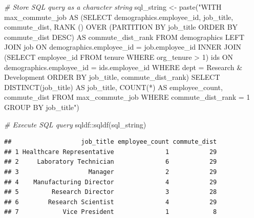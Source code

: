 \documentclass[
]{book}
\newenvironment{Shaded}{\begin{snugshade}}{\end{snugshade}}
\newcommand{\CommentTok}[1]{\textcolor[rgb]{0.56,0.35,0.01}{\textit{#1}}}
\newcommand{\FunctionTok}[1]{\textcolor[rgb]{0.00,0.00,0.00}{#1}}
\newcommand{\NormalTok}[1]{#1}
\newcommand{\OtherTok}[1]{\textcolor[rgb]{0.56,0.35,0.01}{#1}}
\newcommand{\SpecialCharTok}[1]{\textcolor[rgb]{0.00,0.00,0.00}{#1}}
\newcommand{\StringTok}[1]{\textcolor[rgb]{0.31,0.60,0.02}{#1}}
\begin{document}
\begin{Shaded}
\begin{Highlighting}[]
\CommentTok{\# Store SQL query as a character string}
\NormalTok{sql\_string }\OtherTok{\textless{}{-}} \FunctionTok{paste}\NormalTok{(}\StringTok{"WITH max\_commute\_job}
\StringTok{                     AS}
\StringTok{                        (SELECT}
\StringTok{                          demographics.employee\_id,}
\StringTok{                          job\_title,}
\StringTok{                          commute\_dist,}
\StringTok{                          RANK () OVER (PARTITION BY job\_title ORDER BY commute\_dist DESC) AS commute\_dist\_rank}
\StringTok{                        FROM}
\StringTok{                            demographics}
\StringTok{                          LEFT JOIN}
\StringTok{                            job}
\StringTok{                          ON}
\StringTok{                            demographics.employee\_id = job.employee\_id}
\StringTok{                          INNER JOIN}
\StringTok{                            (SELECT employee\_id FROM tenure WHERE org\_tenure \textgreater{} 1) ids}
\StringTok{                          ON}
\StringTok{                            demographics.employee\_id = ids.employee\_id}
\StringTok{                        WHERE}
\StringTok{                          dept = \textquotesingle{}Research \& Development\textquotesingle{}}
\StringTok{                        ORDER BY}
\StringTok{                          job\_title,}
\StringTok{                          commute\_dist\_rank)}
\StringTok{                      }
\StringTok{                      SELECT}
\StringTok{                        DISTINCT(job\_title) AS job\_title,}
\StringTok{                        COUNT(*) AS employee\_count,}
\StringTok{                        commute\_dist}
\StringTok{                     FROM}
\StringTok{                        max\_commute\_job}
\StringTok{                      WHERE}
\StringTok{                        commute\_dist\_rank = 1}
\StringTok{                      GROUP BY}
\StringTok{                        job\_title"}\NormalTok{)}

\CommentTok{\# Execute SQL query}
\NormalTok{sqldf}\SpecialCharTok{::}\FunctionTok{sqldf}\NormalTok{(sql\_string)}
\end{Highlighting}
\end{Shaded}

\begin{verbatim}
##                   job_title employee_count commute_dist
## 1 Healthcare Representative              1           29
## 2     Laboratory Technician              6           29
## 3                   Manager              2           29
## 4    Manufacturing Director              4           29
## 5         Research Director              3           28
## 6        Research Scientist              4           29
## 7            Vice President              1            8
\end{verbatim}
\end{document}
